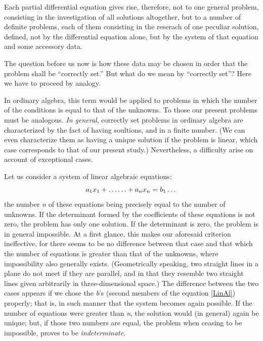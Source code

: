 \documentclass[12pt,oneside]{book}
\begin{document}
Each partial differential equation gives rise, therefore, not to one general problem, 
consisting in the investigation of all solutions altogether, but to a number of definite problems,
each of them consisting in the reserach of one peculiar solution, defined, not by the differential equation alone,
but by the system of that equation and some accessory data. \par 

The question before us now is how these data may be chosen in order that the problem shall be ``correctly set.''
But what do we mean by ``correctly set''? Here we have to proceed by analogy. \par 

In ordinary algebra, this term would be applied to problems in which the number of the conditions is equal to that
of the unknowns. To those our present problems must be analogous. \textit{In general}, correctly set problems in 
ordinary algebra are characterized by the fact of having soultions, and in a finite number. (We can even characterize
them as having a unique solution if the problem is linear, which case corresponds to that of our present study.) 
Nevertheless, a difficulty arise on account of exceptional cases. \par 

Let us consider a system of linear algebraic equations: 
\begin{equation}
    \label{LinAl}
    a_1x_1 + \dots\ldots + a_nx_n = b_1\ldots \\
\end{equation}
the number \textit{n} of these equations being precisely equal to the number of unknowns. 
If the determinant formed by the coefficients of these equations is not zero, the problem has only one solution.
If the determinant is zero, the problem is in general impossible. At a first glance, this makes our aforesaid 
criterion ineffective, for there seems to be no difference between that case and that which the number of equations
is greater than that of the unknowns, where impossibility also generally exists. (Geometrically speaking, two straight
lines in a plane do not meet if they are parallel, and in that they resemble two straight lines given arbitrarily
in three-dimensional space.) The difference between the two cases appears if we chose the \textit{b}'s (second 
members of the equation \ref{LinAl}) properly; that is, in such manner that the system becomes again possible. 
If the number of equations were greater than \textit{n}, the solution would (in general) again be unique; but, 
if those two numbers are equal, the problem when ceasing to be impossible, proves to be \textit{indeterminate}. \par 
\end{document}
